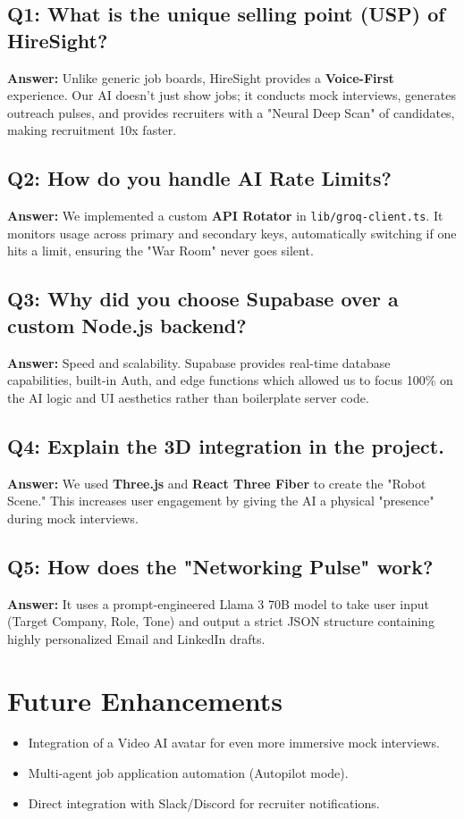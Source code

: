 \documentclass[12pt]{article}
\begin{document}
\subsection*{Q1: What is the unique selling point (USP) of HireSight?}
\textbf{Answer:} Unlike generic job boards, HireSight provides a \textbf{Voice-First} experience. Our AI doesn't just show jobs; it conducts mock interviews, generates outreach pulses, and provides recruiters with a "Neural Deep Scan" of candidates, making recruitment 10x faster.

\subsection*{Q2: How do you handle AI Rate Limits?}
\textbf{Answer:} We implemented a custom \textbf{API Rotator} in \texttt{lib/groq-client.ts}. It monitors usage across primary and secondary keys, automatically switching if one hits a limit, ensuring the "War Room" never goes silent.

\subsection*{Q3: Why did you choose Supabase over a custom Node.js backend?}
\textbf{Answer:} Speed and scalability. Supabase provides real-time database capabilities, built-in Auth, and edge functions which allowed us to focus 100\% on the AI logic and UI aesthetics rather than boilerplate server code.

\subsection*{Q4: Explain the 3D integration in the project.}
\textbf{Answer:} We used \textbf{Three.js} and \textbf{React Three Fiber} to create the "Robot Scene." This increases user engagement by giving the AI a physical "presence" during mock interviews.

\subsection*{Q5: How does the "Networking Pulse" work?}
\textbf{Answer:} It uses a prompt-engineered Llama 3 70B model to take user input (Target Company, Role, Tone) and output a strict JSON structure containing highly personalized Email and LinkedIn drafts.

\section{Future Enhancements}
\begin{itemize}
    \item Integration of a Video AI avatar for even more immersive mock interviews.
    \item Multi-agent job application automation (Autopilot mode).
    \item Direct integration with Slack/Discord for recruiter notifications.
\end{itemize}
\end{document}
